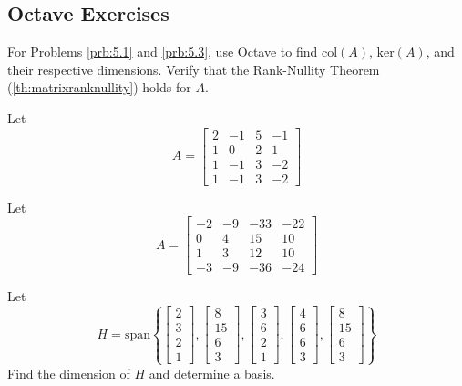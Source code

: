 \documentclass{ximera}
\begin{document}
\subsection*{Octave Exercises}
For Problems \ref{prb:5.1} and \ref{prb:5.3}, use Octave to find $\text{col}(A)$, $\text{ker}(A)$, and their respective dimensions.  Verify that the Rank-Nullity Theorem (\ref{th:matrixranknullity}) holds for $A$.

\begin{problem}\label{prb:5.1} Let 
    $$A = 
\begin{bmatrix}
2 & -1 & 5 & -1\\
1 & 0 &2 & 1 \\
1 & -1 & 3 & -2\\
1 & -1 & 3 & -2
\end{bmatrix}$$ 
\end{problem}

\begin{problem}\label{prb:5.3} Let $$A=
\begin{bmatrix}
-2 & -9 & -33 & -22\\
0 & 4 & 15 & 10\\
1 & 3 & 12 & 10\\
-3 & -9 &-36 & -24
\end{bmatrix}$$ 
\end{problem}

\begin{problem}\label{prb:5.5} Let $$H=\mbox{span}\left\{ \left[
    \begin{array}{r}
    2 \\
    3 \\
    2 \\
    1
    \end{array}
    \right] ,\left[
    \begin{array}{r}
    8 \\
    15 \\
    6 \\
    3
    \end{array}
    \right] ,\left[
    \begin{array}{r}
    3 \\
    6 \\
    2 \\
    1
    \end{array}
    \right] ,\left[
    \begin{array}{r}
    4 \\
    6 \\
    6 \\
    3
    \end{array}
    \right] ,\left[
    \begin{array}{r}
    8 \\
    15 \\
    6 \\
    3
    \end{array}
    \right] \right\} $$ 
    Find the dimension of $H$ and determine a basis.
    
    \end{problem}
\end{document}
